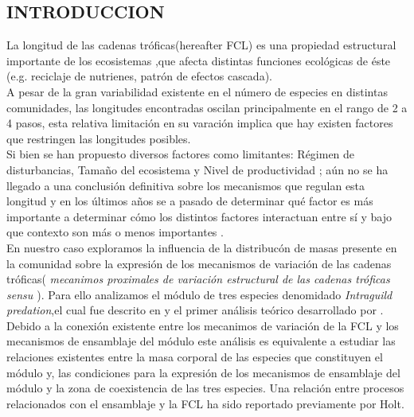 \subsection{INTRODUCCION}

La longitud de las cadenas tr\'oficas(hereafter FCL) es una propiedad estructural importante de los ecosistemas ,que afecta distintas funciones ecol\'ogicas de \'este (e.g. reciclaje de nutrienes, patr\'on de efectos cascada).\\
A pesar de la gran variabilidad existente en el n\'umero de especies en distintas comunidades, las longitudes encontradas oscilan principalmente en el rango de 2 a 4 pasos\citep{elton1927animal,pimm1978feeding,yodzis1981structure}, esta relativa limitaci\'on en su varaci\'on implica que hay existen factores que restringen las longitudes posibles.\\
Si bien se han propuesto diversos factores como limitantes: R\'egimen de disturbancias, Tama\~no del ecosistema y Nivel de productividad \citep{post2002long,takimoto2013environmental}; a\'un no se ha llegado a una conclusi\'on definitiva sobre los mecanismos que regulan esta longitud \citep{sterner1997enigma,takimoto2013environmental} y en los \'ultimos a\~nos se a pasado de determinar qu\'e factor es m\'as importante a determinar c\'omo los distintos factores interactuan entre s\'i y bajo que contexto son m\'as o menos importantes \citep{post2002long}.\\

En nuestro caso exploramos la influencia de la distribuc\'on de masas presente en la comunidad sobre la expresi\'on de los mecanismos de variaci\'on de las cadenas tr\'oficas( \emph{mecanimos proximales de variaci\'on estructural de las cadenas tr\'oficas sensu \cite{TP2007proximate}}). Para ello analizamos el m\'odulo de tres especies denomidado \emph{Intraguild predation},el cual fue descrito en \cite{polis1989ecology} y el primer an\'alisis te\'orico desarrollado por \cite{holt1997theoretical}. Debido a la conexi\'on existente entre los mecanimos de variaci\'on de la FCL y los mecanismos de ensamblaje del m\'odulo\citep{TP2007proximate} este an\'alisis es equivalente a estudiar las relaciones existentes entre la masa corporal de las especies que constituyen el m\'odulo y, las condiciones para la expresi\'on de los mecanismos de ensamblaje del m\'odulo y la zona de coexistencia de las tres especies. Una relaci\'on entre procesos relacionados con el ensamblaje y la FCL ha sido reportado previamente por Holt\citep{holt2002food}.\\

